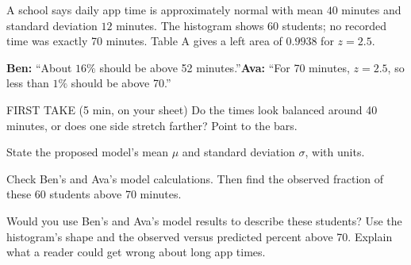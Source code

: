 \documentclass[14pt]{extarticle}
\begin{document}
\pagestyle{empty}


\noindent\begin{minipage}[t]{0.57\linewidth}
\vspace{0pt}
A school says daily app time is approximately normal with mean $40$ minutes and standard deviation $12$ minutes. The histogram shows 60 students; no recorded time was exactly 70 minutes. Table A gives a left area of $0.9938$ for $z=2.5$.\par\smallskip \textbf{Ben:} ``About $16\%$ should be above 52 minutes.''\quad \textbf{Ava:} ``For 70 minutes, $z=2.5$, so less than $1\%$ should be above 70.''\par
\end{minipage}\hfill
\begin{minipage}[t]{0.40\linewidth}
\vspace{0pt}
\begin{center}
\end{center}
\end{minipage}

\begin{firsttakebox}{FIRST TAKE (5 min, on your sheet)}
Do the times look balanced around 40 minutes, or does one side stretch farther? Point to the bars.
\end{firsttakebox}

\begin{description}[leftmargin=1.15in, labelwidth=1in, itemsep=2pt, topsep=2pt]
  \item[\dokbadge{1}~(a)] State the proposed model's mean $\mu$ and standard deviation $\sigma$, with units.
  \item[\dokbadge{2}~(b)] Check Ben's and Ava's model calculations. Then find the observed fraction of these 60 students above 70 minutes.
  \item[\dokbadge{3}~(c)] Would you use Ben's and Ava's model results to describe these students? Use the histogram's shape and the observed versus predicted percent above 70. Explain what a reader could get wrong about long app times.
\end{description}
\end{document}
